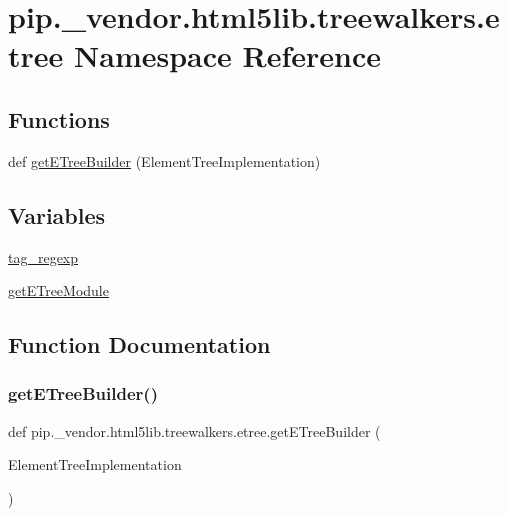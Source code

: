 \hypertarget{namespacepip_1_1__vendor_1_1html5lib_1_1treewalkers_1_1etree}{}\section{pip.\+\_\+vendor.\+html5lib.\+treewalkers.\+etree Namespace Reference}
\label{namespacepip_1_1__vendor_1_1html5lib_1_1treewalkers_1_1etree}
\subsection*{Functions}
\begin{DoxyCompactItemize}
\item 
def \hyperlink{namespacepip_1_1__vendor_1_1html5lib_1_1treewalkers_1_1etree_a31d0fa551c5fa3de49528f0b3f5863e0}{get\+E\+Tree\+Builder} (Element\+Tree\+Implementation)
\end{DoxyCompactItemize}
\subsection*{Variables}
\begin{DoxyCompactItemize}
\item 
\hyperlink{namespacepip_1_1__vendor_1_1html5lib_1_1treewalkers_1_1etree_abe4e11887ffa4ec6caf36cc1e3a968d1}{tag\+\_\+regexp}
\item 
\hyperlink{namespacepip_1_1__vendor_1_1html5lib_1_1treewalkers_1_1etree_acf469e2d8403641333cdf11cf0409074}{get\+E\+Tree\+Module}
\end{DoxyCompactItemize}


\subsection{Function Documentation}
\mbox{\label{namespacepip_1_1__vendor_1_1html5lib_1_1treewalkers_1_1etree_a31d0fa551c5fa3de49528f0b3f5863e0}} 
\subsubsection{\texorpdfstring{get\+E\+Tree\+Builder()}{getETreeBuilder()}}
{\footnotesize\ttfamily def pip.\+\_\+vendor.\+html5lib.\+treewalkers.\+etree.\+get\+E\+Tree\+Builder (\begin{DoxyParamCaption}\item[{}]{Element\+Tree\+Implementation }\end{DoxyParamCaption})}



